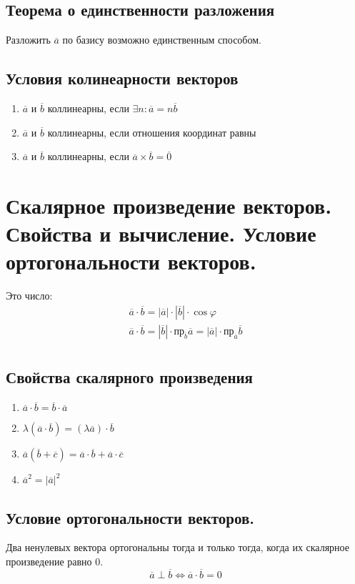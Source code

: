 \documentclass[12pt, fleqn]{article}
\begin{document}
\subsection*{Теорема о единственности разложения}
Разложить $\overline{a}$ по базису возможно единственным способом.
\subsection*{Условия колинеарности векторов}
\begin{enumerate}
	\item $\overline{a}$ и $\overline{b}$ коллинеарны, если  $\exists n\colon \overline{a} =n\overline{b}$
	\item $\overline{a}$ и $\overline{b}$ коллинеарны, если отношения координат равны
	\item $\overline{a}$ и $\overline{b}$ коллинеарны, если $\overline{a}\times\overline{b}=\overline{0}$
\end{enumerate}
\section{Скалярное произведение векторов. Свойства и вычисление. Условие ортогональности векторов.}
Это число:
\begin{multline}
	\overline{a}\cdot\overline{b} = \left|\overline{a}\right|\cdot\left|\overline{b}\right|\cdot\cos \varphi\\
	\overline{a}\cdot\overline{b} = \left|\overline{b}\right|\cdot \text{пр}_{\overline{b}}\overline{a}=\left|\overline{a}\right|\cdot \text{пр}_{\overline{a}}\overline{b}\\
\end{multline}
\subsection*{Свойства скалярного произведения}
\begin{enumerate}
	\item $\overline{a}\cdot\overline{b} = \overline{b}\cdot\overline{a}$
	\item $\lambda \left(\overline{a}\cdot\overline{b}\right)=\left(\lambda \overline{a}\right)\cdot\overline{b}$
	\item $\overline{a} \left(\overline{b}+\overline{c}\right)=\overline{a}\cdot\overline{b}+\overline{a}\cdot\overline{c}$
	\item $\overline{a}^2=\left|\overline{a}\right|^2$
\end{enumerate}
\subsection*{Условие ортогональности векторов.}
Два ненулевых вектора ортогональны тогда и только тогда, когда их скалярное произведение равно 0.
$$\overline{a}\perp\overline{b}\Leftrightarrow\overline{a}\cdot\overline{b}=0$$
\end{document}
